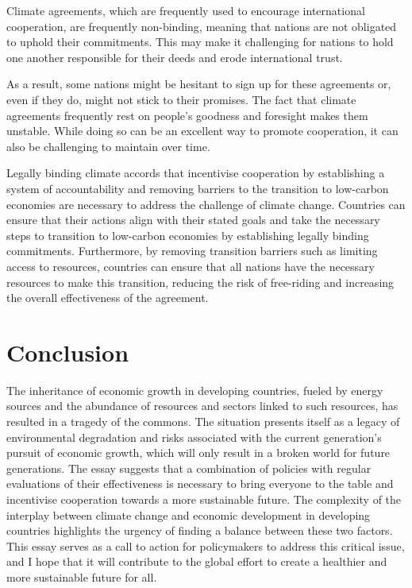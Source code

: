 \documentclass[11pt,a4paper]{article}
\begin{document}
Climate agreements, which are frequently used to encourage international cooperation, are frequently non-binding, meaning that nations are not obligated to uphold their commitments. This may make it challenging for nations to hold one another responsible for their deeds and erode international trust.  \par
As a result, some nations might be hesitant to sign up for these agreements or, even if they do, might not stick to their promises. The fact that climate agreements frequently rest on people's goodness and foresight makes them unstable. While doing so can be an excellent way to promote cooperation, it can also be challenging to maintain over time. \par
Legally binding climate accords that incentivise cooperation by establishing a system of accountability and removing barriers to the transition to low-carbon economies are necessary to address the challenge of climate change. Countries can ensure that their actions align with their stated goals and take the necessary steps to transition to low-carbon economies by establishing legally binding commitments. Furthermore, by removing transition barriers such as limiting access to resources, countries can ensure that all nations have the necessary resources to make this transition, reducing the risk of free-riding and increasing the overall effectiveness of the agreement.
\section*{Conclusion}
The inheritance of economic growth in developing countries, fueled by energy sources and the abundance of resources and sectors linked to such resources, has resulted in a tragedy of the commons. The situation presents itself as a legacy of environmental degradation and risks associated with the current generation's pursuit of economic growth, which will only result in a broken world for future generations. The essay suggests that a combination of policies with regular evaluations of their effectiveness is necessary to bring everyone to the table and incentivise cooperation towards a more sustainable future. The complexity of the interplay between climate change and economic development in developing countries highlights the urgency of finding a balance between these two factors. This essay serves as a call to action for policymakers to address this critical issue, and I hope that it will contribute to the global effort to create a healthier and more sustainable future for all.

\printbibliography
\end{document}
